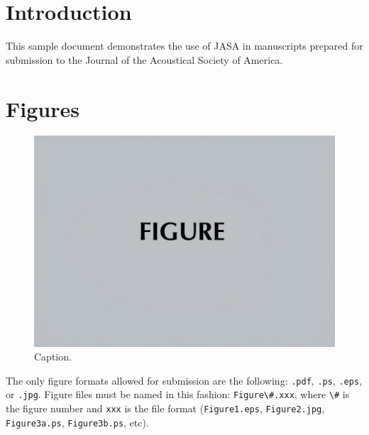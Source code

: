 \documentclass[preprint]{JASA}
\begin{document}



\hypertarget{introduction}{%
\section{Introduction}\label{introduction}}

This sample document demonstrates the use of JASA in manuscripts
prepared for submission to the Journal of the Acoustical Society of
America.

\hypertarget{figures}{%
\section{Figures}\label{figures}}

\begin{figure}
\includegraphics[width=\reprintcolumnwidth]{figsamp} \caption{Caption.}\label{fig:Figure1}
\end{figure}

The only figure formats allowed for submission are the following:
\texttt{.pdf}, \texttt{.ps}, \texttt{.eps}, or \texttt{.jpg}. Figure
files must be named in this fashion:
\texttt{Figure\textbackslash{}\#.xxx}, where \texttt{\textbackslash{}\#}
is the figure number and \texttt{xxx} is the file format
(\texttt{Figure1.eps}, \texttt{Figure2.jpg}, \texttt{Figure3a.ps},
\texttt{Figure3b.ps}, etc).
\end{document}

